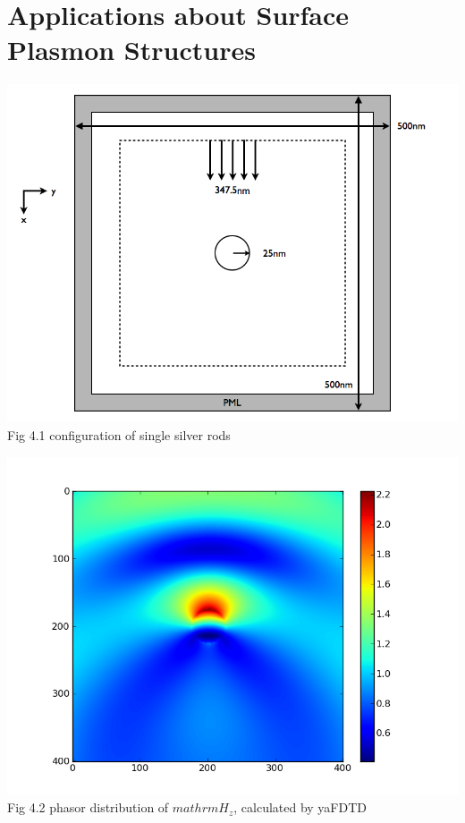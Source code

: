 \documentclass[openany]{book}
\begin{document}
\chapter{Applications about Surface Plasmon Structures}


\clearpage
\begin{center}
\includegraphics[scale=0.5]{images/single-rod-config.jpg}\\
Fig 4.1
configuration of single silver rods
\end{center}
\begin{center}
\includegraphics[scale=0.8]{images/phasor-exam-fdtd.png}\\
Fig 4.2
phasor distribution of $mathrm{H_z}$, calculated by yaFDTD
\end{center}
\end{document}
